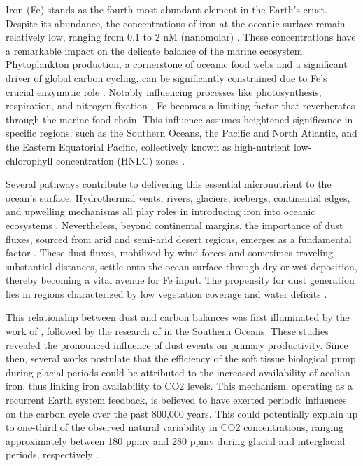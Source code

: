 
Iron (Fe) stands as the fourth most abundant element in the Earth’s crust. Despite its abundance, the concentrations of iron at the oceanic surface remain relatively low, ranging from 0.1 to 2 nM (nanomolar) \cite{nakabayashi2002variation,tani2003iron}. These concentrations have a remarkable impact on the delicate balance of the marine ecosystem. Phytoplankton production, a cornerstone of oceanic food webs and a significant driver of global carbon cycling, can be significantly constrained due to Fe’s crucial enzymatic role \cite{martin1990glacial,jickells2005global,martinez2014iron}. Notably influencing processes like photosynthesis, respiration, and nitrogen fixation \cite{falkowski1998biogeochemical,morel2003biogeochemical,kustka2003revised}, Fe becomes a limiting factor that reverberates through the marine food chain. This influence assumes heightened significance in specific regions, such as the Southern Oceans, the Pacific and North Atlantic, and the Eastern Equatorial Pacific, collectively known as high-nutrient low-chlorophyll concentration (HNLC) zones \cite{coale1996massive,boyd2000mesoscale,boyd2004decline,boyd2007mesoscale}. 

Several pathways contribute to delivering this essential micronutrient to the ocean’s surface. Hydrothermal vents, rivers, glaciers, icebergs, continental edges, and upwelling mechanisms all play roles in introducing iron into oceanic ecosystems \cite{ducklow2003role,tagliabue2016well}. Nevertheless, beyond continental margins, the importance of dust fluxes, sourced from arid and semi-arid desert regions, emerges as a fundamental factor \cite{tagliabue2017integral,lambert2021regional}. These dust fluxes, mobilized by wind forces and sometimes traveling substantial distances, settle onto the ocean surface through dry or wet deposition, thereby becoming a vital avenue for Fe input. The propensity for dust generation lies in regions characterized by low vegetation coverage and water deficits \cite{prospero2003african,prospero2002environmental,jickells2005global,mahowald2005atmospheric,buseck2008nanoparticles,hand2003estimates}.

This relationship between dust and carbon balances was first illuminated by the work of , followed by the research of  in the Southern Oceans. These studies revealed the pronounced influence of dust events on primary productivity. Since then, several works \cite{kohfeld2005role,jaccard2013two,petit1990palaeoclimatological,steffensen1997size,lambert2008dust,archer2000caused} postulate that the efficiency of the soft tissue biological pump during glacial periods could be attributed to the increased availability of aeolian iron, thus linking iron availability to CO2 levels. This mechanism, operating as a recurrent Earth system feedback, is believed to have exerted periodic influences on the carbon cycle over the past 800,000 years. This could potentially explain up to one-third of the observed natural variability in CO2 concentrations, ranging approximately between 180 ppmv and 280 ppmv during glacial and interglacial periods, respectively \cite{petit1990palaeoclimatological,siegenthaler2005stable,luthi2008high}.

